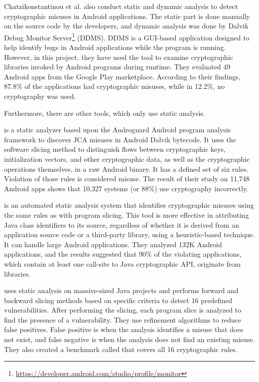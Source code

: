 Chatzikonstantinou et al. \cite{cx16} also conduct static and dynamic analysis to detect cryptographic misuses in Android applications. The static part is done manually on the source code by the developers, and dynamic analysis was done by Dalvik Debug Monitor Server\footnote{\url{https://developer.android.com/studio/profile/monitor}} (DDMS). DDMS is a GUI-based application designed to help identify bugs in Android applications while the program is running. However, in this project, they have used the tool to examine cryptographic libraries invoked by Android programs during runtime.
They evaluated 49 Android apps from the Google Play marketplace. According to their findings, 87.8\% of the applications had cryptographic misuses, while in 12.2\%, no cryptography was used.


\noindent Furthermore, there are other tools, which only use static analysis.


\cryptolint{} \cite{emp13} is a static analyzer based upon the Androguard \cite{androguard} Android program analysis framework to discover JCA misuses in Android Dalvik bytecode. It uses the software slicing method to distinguish flows between cryptographic keys, initialization vectors, and other cryptographic data, as well as the cryptographic operations themselves, in a raw Android binary. It has a defined set of six rules. Violation of those rules is considered misuse. The result of their study on 11,748 Android apps shows that 10,327 systems (or 88\%) use cryptography incorrectly.


\binsight{} \cite{bin18} is an automated static analysis system that identifies cryptographic misuses using the same rules as \cryptolint{} with program slicing. This tool is more effective in attributing Java class identifiers to its source, regardless of whether it is derived from an application source code or a third-party library, using a heuristic-based technique. It can handle large Android applications. They analyzed 132K Android applications, and the results suggested that 90\% of the violating applications, which contain at least one call-site to Java cryptographic API, originate from libraries.

\cryptoguard{} \cite{sr19} uses static analysis on massive-sized Java projects and performs forward and backward slicing methods based on specific criteria to detect 16 predefined vulnerabilities. After performing the slicing, each program slice is analyzed to find the presence of a vulnerability. They use refinement algorithms to reduce false positives. False positive is when the analysis identifies a misuse that does not exist, and false negative is when the analysis does not find an existing misuse. They also created a benchmark called \cryptoapibench{} \cite{cryptoapibench} that covers all 16 cryptographic rules.



